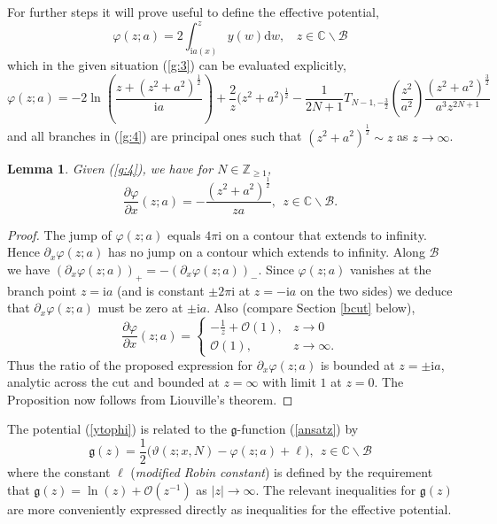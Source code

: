 \documentclass[10pt,reqno,oneside]{amsart}
\def \gg{{\mathfrak g}}
\renewcommand{\d}{{\mathrm d}}
\newcommand{\im}{\mathrm{i}}
\numberwithin{equation}{section}
\newtheorem{lemma}[theo]{Lemma}
\def\bl{\begin{lemma}}
\def\el{\end{lemma}}
\def\be{\begin{equation}}
\def\ee{\end{equation}}
\def \pa{\partial}
\def\eqref#1{(\ref{#1})}
\begin{document}
For further steps it will prove useful to define the effective potential,
\begin{equation}
\label{ytophi}
	\varphi(z;a)=2\int_{\im a(x)}^zy(w)\d w,\ \ \ \ z\in\mathbb{C}\backslash\mathcal{B}
\end{equation}
which in the given situation \eqref{g:3} can be evaluated explicitly,
\begin{equation}\label{g:4}
	\varphi(z;a)=-2\ln\left(\frac{z+(z^2+a^2)^{\frac{1}{2}}}{\im a}\right)+\frac{2}{z}\big(z^2+a^2\big)^{\frac{1}{2}}-\frac{1}{2N+1}T_{N-1,-\frac{3}{2}}\left(\frac{z^2}{a^2}\right)\frac{(z^2+a^2)^{\frac{3}{2}}}{a^3z^{2N+1}}
\end{equation}
and all branches in \eqref{g:4} are principal ones such that $(z^2+a^2)^{\frac{1}{2}}\sim z$ as $z\rightarrow\infty$.
\bl
\label{Lemmader}
Given \eqref{g:4}, we have for $N\in\mathbb{Z}_{\geq 1}$,
\be
	\frac{\partial\varphi}{\partial x}(z;a) = -  \frac{(z^2 + a^2)^{\frac{1}{2}}}{za},\ \ z\in\mathbb{C}\backslash\mathcal{B}.
\ee
\el
\begin{proof} The jump of $\varphi(z;a)$ equals $4\pi\im$ on a contour that extends to infinity. Hence $\pa_x \varphi(z;a)$ has no jump on a contour which extends to infinity. Along $\mathcal{B}$ we have $(\pa_x \varphi(z;a))_+ = -(\pa_x\varphi(z;a))_-$. 
 Since $\varphi(z;a)$ vanishes at the branch point $z=\im a$ (and is constant $\pm 2\pi\im$ at $z=-\im a$ on the two sides) we deduce that $\pa_x \varphi(z;a)$ must be zero at $\pm\im a$.  Also (compare Section \ref{bcut} below),
 \be
 \frac{\partial\varphi}{\partial x}(z;a) = \begin{cases}
 -\frac{1}{z}+\mathcal{O}(1),&z\rightarrow 0\\
 \mathcal{O}(1),&z\rightarrow\infty.
 \end{cases}
% 
 \ee
 Thus the ratio of the proposed expression for $\pa_x \varphi(z;a)$ is bounded at $z=\pm\im a$, analytic across the cut and bounded at $z=\infty$ with limit $1$ at $z=0$. The Proposition now follows from Liouville's theorem.
\end{proof}
The potential \eqref{ytophi} is related to the $\gg$-function \eqref{ansatz} by 
\be
\label{phitog}
 	\gg(z)= \frac 1 2 \big(\vartheta(z;x,N)-\varphi(z;a)+\ell\big),\ \ z\in\mathbb{C}\backslash\mathcal{B}
\ee
where the constant $\ell$ ({\em modified Robin constant}) is defined by the requirement that $\gg(z) = \ln (z) + \mathcal O(z^{-1})$ as $|z|\to \infty$. The relevant inequalities for $\gg(z)$ are more conveniently expressed directly as inequalities for the effective potential. 
\end{document}
